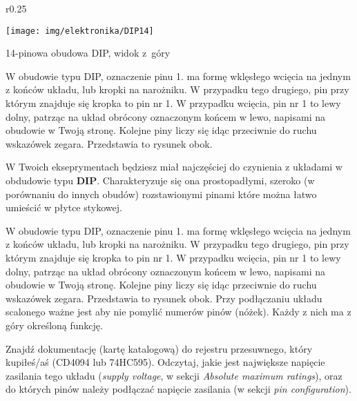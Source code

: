 \documentclass{pdfBooklets}
\begin{document}
\begin{wrapfigure}{r}{0.25\textwidth}
  \begin{center}
    \vspace{-10pt}
    \texttt{[image: img/elektronika/DIP14]}
    \vspace{-40pt}
    
    \small{14-pinowa obudowa DIP, widok z~góry}
    \vspace{-20pt}
  \end{center}
\end{wrapfigure}


W obudowie typu DIP, oznaczenie pinu 1. ma formę wklęsłego wcięcia na jednym z końców układu, lub kropki na narożniku. W przypadku tego drugiego, pin przy którym znajduje się kropka to pin nr 1. W przypadku wcięcia, pin nr 1 to lewy dolny, patrząc na układ obrócony oznaczonym końcem w lewo, napisami na obudowie w Twoją stronę. Kolejne piny liczy się idąc przeciwnie do ruchu wskazówek zegara. Przedstawia to rysunek obok.

W Twoich ekseprymentach będziesz miał najczęściej do czynienia z układami w obdudowie typu \textbf{DIP}. Charakteryzuje się ona prostopadłymi,
szeroko (w porównaniu do innych obudów) rozstawionymi pinami które można łatwo umieścić w płytce stykowej.

W obudowie typu DIP, oznaczenie pinu 1. ma formę wklęsłego wcięcia na jednym z końców układu, lub kropki na narożniku. W przypadku tego drugiego, pin przy którym znajduje się kropka to pin nr 1. W przypadku wcięcia, pin nr 1 to lewy dolny, patrząc na układ obrócony oznaczonym końcem w lewo, napisami na obudowie w Twoją stronę. Kolejne piny liczy się idąc przeciwnie do ruchu wskazówek zegara. Przedstawia to rysunek obok.
Przy podłączaniu układu scalonego ważne jest aby nie pomylić numerów pinów (nóżek). Każdy z nich ma z góry określoną funkcję.


\begin{Zadanie}{}{}
  Znajdź dokumentację (kartę katalogową) do rejestru przesuwnego, który kupiłeś/aś (CD4094 lub 74HC595).
  Odczytaj, jakie jest największe napięcie zasilania tego układu (\textit{supply voltage}, w sekcji
  \textit{Absolute maximum ratings}), oraz do których pinów należy podłączać napięcie zasilania (w sekcji \textit{pin configuration}).
\end{Zadanie}


\end{document}
